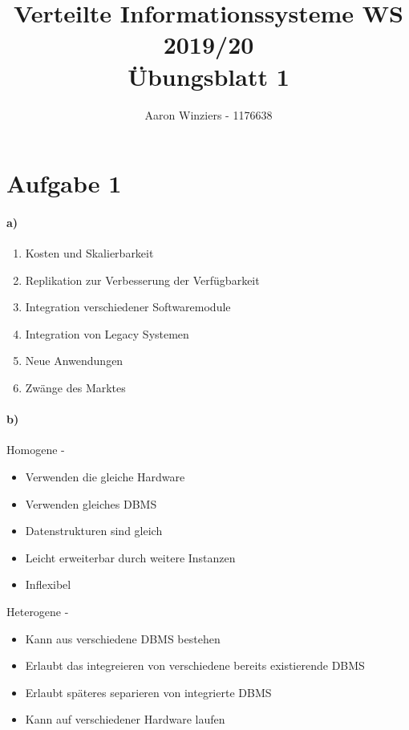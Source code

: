 \documentclass[11pt,a4paper,parskip=half ]{scrartcl}
\author{Aaron Winziers - 1176638}
\title{Verteilte Informationssysteme WS 2019/20\\\LARGE{Übungsblatt 1}}
\begin{document}
	\maketitle
	
	\section*{Aufgabe 1}
	\paragraph{a)}
	\begin{enumerate}
		\item Kosten und Skalierbarkeit
		\item Replikation zur Verbesserung der Verfügbarkeit
		\item Integration verschiedener Softwaremodule
		\item Integration von Legacy Systemen
		\item Neue Anwendungen
		\item Zwänge des Marktes
	\end{enumerate}
	
	
	\paragraph{b)}
	Homogene - 
	\begin{itemize}
		\item Verwenden die gleiche Hardware
		\item Verwenden gleiches DBMS
		\item Datenstrukturen sind gleich
		\item Leicht erweiterbar durch weitere Instanzen
		\item Inflexibel
	\end{itemize}
	
	Heterogene -
	\begin{itemize}
		\item Kann aus verschiedene DBMS bestehen
		\item Erlaubt das integreieren von verschiedene bereits existierende DBMS
		\item Erlaubt späteres separieren von integrierte DBMS
		\item Kann auf verschiedener Hardware laufen
	\end{itemize}
	
	
\end{document}
